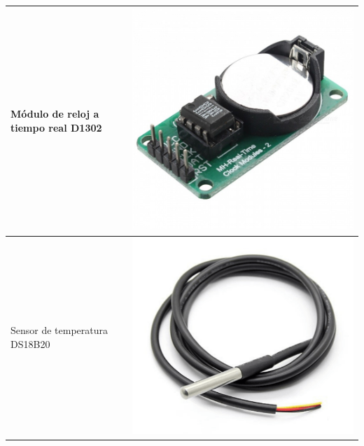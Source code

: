 \documentclass[11pt,twocolumn,letterpaper,spanish]{article}
\begin{document}
\begin{table}[hbt!]
\begin{tabular}{ m{6cm}  m{3.5cm} }
      Módulo de reloj a tiempo real D1302 & \includegraphics[align=t,scale=0.09]{Materiales/reloj}\\
      \hline
      Sensor de temperatura DS18B20 & \includegraphics[align=t,scale=0.1]{Materiales/tempsen}\\
      \hline

\end{tabular}
\end{table}
\end{document}
